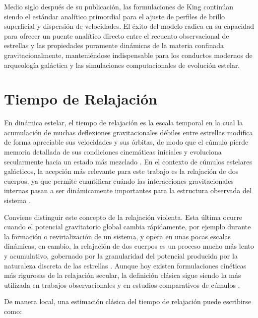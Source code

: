         Medio siglo después de su publicación, las formulaciones de King 
        continúan siendo el estándar analítico primordial para el ajuste de 
        perfiles de brillo superficial y dispersión de velocidades. El éxito del 
        modelo radica en su capacidad para ofrecer un puente analítico directo 
        entre el recuento observacional de estrellas y las propiedades puramente 
        dinámicas de la materia confinada gravitacionalmente, manteniéndose 
        indispensable para los conductos modernos de arqueología galáctica y las 
        simulaciones computacionales de evolución estelar.

\section{Tiempo de Relajación}
\label{sec:tiempo_de_relajacion}

    En dinámica estelar, el tiempo de relajación es la escala temporal en la 
    cual la acumulación de muchas deflexiones gravitacionales débiles entre 
    estrellas modifica de forma apreciable sus velocidades y sus órbitas, de 
    modo que el cúmulo pierde memoria detallada de sus condiciones cinemáticas 
    iniciales y evoluciona secularmente hacia un estado más mezclado 
    \cite{Spitzer1987,BinneyTremaine2008}. En el contexto de cúmulos estelares 
    galácticos, la acepción más relevante para este trabajo es la relajación de 
    dos cuerpos, ya que permite cuantificar cuándo las interacciones 
    gravitacionales internas pasan a ser dinámicamente importantes para la 
    estructura observada del sistema \cite{Spitzer1987,MeylanHeggie1997}. 

    Conviene distinguir este concepto de la relajación violenta. Esta última 
    ocurre cuando el potencial gravitatorio global cambia rápidamente, por 
    ejemplo durante la formación o revirialización de un sistema, y opera en 
    unas pocas escalas dinámicas; en cambio, la relajación de dos cuerpos es un 
    proceso mucho más lento y acumulativo, gobernado por la granularidad del 
    potencial producida por la naturaleza discreta de las estrellas 
    \cite{LyndenBell1967,BinneyTremaine2008}. Aunque hoy existen formulaciones 
    cinéticas más rigurosas de la relajación secular, la definición clásica 
    sigue siendo la más utilizada en trabajos observacionales y en estudios 
    comparativos de cúmulos \cite{Hamilton2018,Spitzer1987}.

    De manera local, una estimación clásica del tiempo de relajación puede 
    escribirse como:
    
